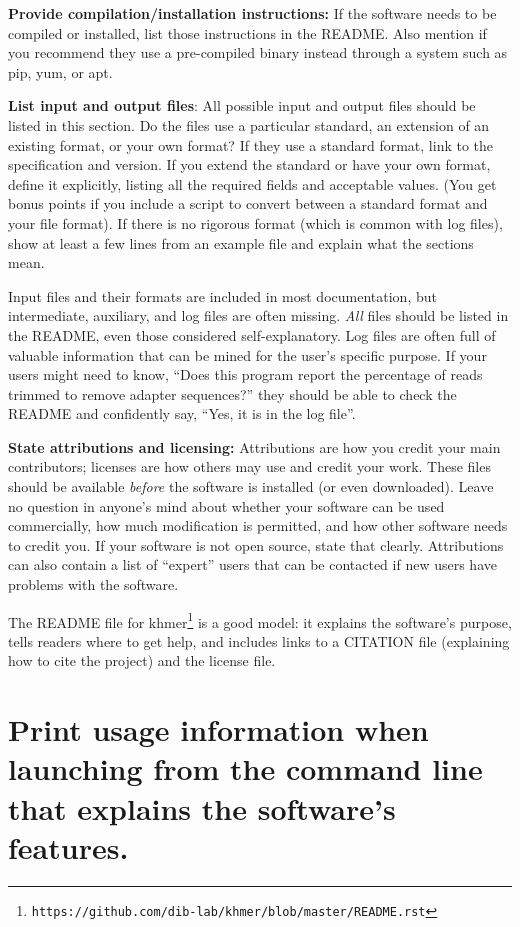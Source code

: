 \documentclass[10pt,letterpaper]{article}
\newcommand{\withurl}[2]{{#1}\footnote{\texttt{#2}}}
\begin{document}
\textbf{Provide compilation/installation instructions:}
If the software needs to be compiled
or installed, list those instructions in the README. Also
mention if you recommend they use a pre-compiled binary instead
through a system such as pip, yum, or apt.

\textbf{List input and output files}: All possible input and output files
should be listed in this section. Do the files use a particular
standard, an extension of an existing format, or your own
format?  If they use a standard format, link to the specification and
version. If you extend the standard or have your own format, define it
explicitly, listing all the required fields and acceptable values.
(You get bonus points if you include a script to convert between
a standard format and your file format). If there is no rigorous format
(which is common with log files), show at least a few lines from an
example file and explain what the sections mean.

Input files and their formats are included in most documentation, but
intermediate, auxiliary, and log files are often missing.
\emph{All} files should be listed in the README, even those considered self-explanatory. Log
files are often full of valuable information that can be
mined for the user's specific purpose. If your users might need to know,
``Does this program report the percentage of reads trimmed to remove
adapter sequences?'' they should be able to check the README and confidently
say, ``Yes, it is in the log file''.

\textbf{State attributions and licensing:} Attributions are how you credit
your main contributors; licenses are how others may use and
credit your work. These files should be available \emph{before}
the software is installed (or even downloaded).
Leave no
question in anyone's mind about whether your software can be used
commercially, how much modification is permitted, and how other software
needs to credit you. If your software is not open source, state that clearly.
Attributions can also contain a list of ``expert'' users
that can be contacted if new users have problems with the software.

The README file for \withurl{khmer}{https://github.com/dib-lab/khmer/blob/master/README.rst}
is a good model:
it explains the software's purpose,
tells readers where to get help,
and includes links to a CITATION file (explaining how to cite the project)
and the license file.

\section{Print usage information when launching from the command line that explains the software's features.}
\end{document}
